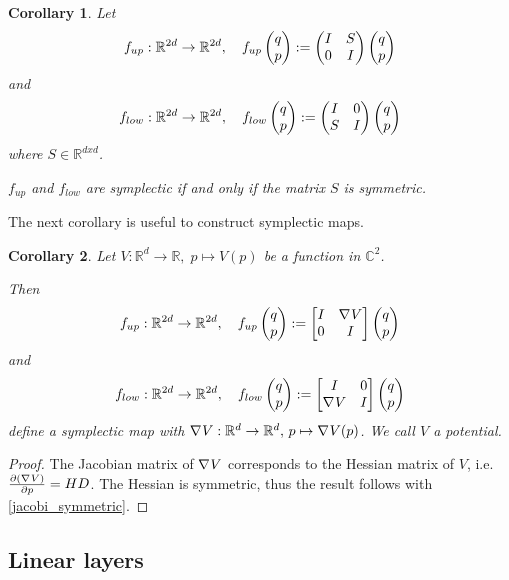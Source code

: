 \documentclass[twoside,a4paper]{article}
\newtheorem{corollary}{Corollary}
\begin{document}
\begin{corollary}\label{matrix_symmetric}
	Let
	\begin{equation*}
		f_{up} : \mathbb{R}^{2d} \to \mathbb{R}^{2d},\quad
		f_{up} \begin{pmatrix} q \\ p \end{pmatrix} := \begin{pmatrix}
			I & S \\
			0 & I
		\end{pmatrix} \begin{pmatrix} q \\ p \end{pmatrix}
	\end{equation*}
	and
	\begin{equation*}
		f_{low} : \mathbb{R}^{2d} \to \mathbb{R}^{2d},\quad
		f_{low} \begin{pmatrix} q \\ p \end{pmatrix} := \begin{pmatrix}
			I & 0 \\
			S & I
		\end{pmatrix} \begin{pmatrix} q \\ p \end{pmatrix}
	\end{equation*}
	where $S \in \mathbb{R}^{dxd}$. 

	$f_{up}$ and $f_{low}$ are symplectic if and only if the matrix $S$
	is symmetric.
\end{corollary}

The next corollary is useful to construct symplectic maps.
\begin{corollary}\label{gradient_corollary}
	Let $V: \mathbb{R}^d \to \mathbb{R}, \; p \mapsto V(p)$ be a function in 
	$\mathbb{C}^2$. 
	
	Then
	\begin{equation*}
		f_{up} : \mathbb{R}^{2d} \to \mathbb{R}^{2d},\quad
		f_{up} \begin{pmatrix} q \\ p \end{pmatrix} := \begin{bmatrix} I & {\nabla_{}{V}} \\ 0 & I \end{bmatrix} \begin{pmatrix} q \\ p \end{pmatrix}
	\end{equation*}
	and
	\begin{equation*}
		f_{low} : \mathbb{R}^{2d} \to \mathbb{R}^{2d},\quad
		f_{low} \begin{pmatrix} q \\ p \end{pmatrix} := \begin{bmatrix} I & 0 \\ {\nabla_{}{V}} & I \end{bmatrix} \begin{pmatrix} q \\ p \end{pmatrix}
	\end{equation*}
	define a symplectic map with $\nabla_{}{V} : \mathbb{R}^d \to \mathbb{R}^d,\, p \mapsto \nabla_{}{V}(p)$. 
	We call $V$ a potential.
\end{corollary}
\begin{proof}
	The Jacobian matrix of $\nabla_{}{V}$ corresponds to the Hessian matrix of $V$,
	i.e. $\frac{\partial (\nabla_{}{V})}{\partial p} = HD$. 
	The Hessian is symmetric, thus the result follows with \cref{jacobi_symmetric}.
\end{proof}


\subsection{Linear layers}
\end{document}
